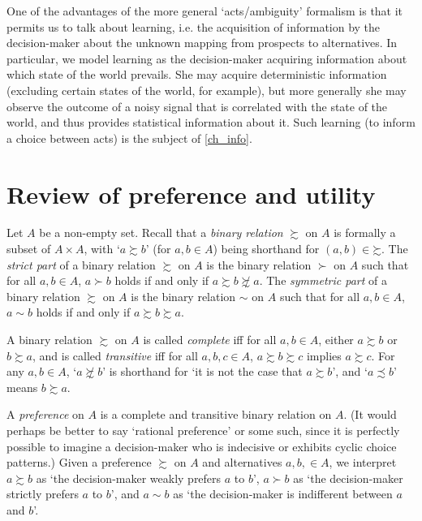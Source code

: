 \documentclass[11pt,letterpaper,reqno,oneside]{book}
\begin{document}
One of the advantages of the more general `acts/ambiguity' formalism is that it permits us to talk about learning, i.e. the acquisition of information by the decision-maker about the unknown mapping from prospects to alternatives. In particular, we model learning as the decision-maker acquiring information about which state of the world prevails. She may acquire deterministic information (excluding certain states of the world, for example), but more generally she may observe the outcome of a noisy signal that is correlated with the state of the world, and thus provides statistical information about it. Such learning (to inform a choice between acts) is the subject of \cref{ch_info}.



\section{Review of preference and utility}
\label{ch0:review}

Let $A$ be a non-empty set. Recall that a \emph{binary relation} $\succsim$ on $A$ is formally a subset of $A \times A$, with `$a \succsim b$' (for $a,b \in A$) being shorthand for $(a,b) \in \mathord{\succsim}$. The \emph{strict part} of a binary relation $\succsim$ on $A$ is the binary relation $\succ$ on $A$ such that for all $a,b \in A$, $a \succ b$ holds if and only if $a \succsim b \not\succsim a$. The \emph{symmetric part} of a binary relation $\succsim$ on $A$ is the binary relation $\sim$ on $A$ such that for all $a,b \in A$, $a \sim b$ holds if and only if $a \succsim b \succsim a$.

A binary relation $\succsim$ on $A$ is called \emph{complete} iff for all $a,b \in A$, either $a \succsim b$ or $b \succsim a$, and is called \emph{transitive} iff for all $a,b,c \in A$, $a \succsim b \succsim c$ implies $a \succsim c$. For any $a,b \in A$, `$a \not\succsim b$' is shorthand for `it is not the case that $a \succsim b$', and `$a \precsim b$' means $b \succsim a$.

A \emph{preference} on $A$ is a complete and transitive binary relation on $A$. (It would perhaps be better to say `rational preference' or some such, since it is perfectly possible to imagine a decision-maker who is indecisive or exhibits cyclic choice patterns.) Given a preference $\succsim$ on $A$ and alternatives $a,b, \in A$, we interpret $a \succsim b$ as `the decision-maker weakly prefers $a$ to $b$', $a \succ b$ as `the decision-maker strictly prefers $a$ to $b$', and $a \sim b$ as `the decision-maker is indifferent between $a$ and $b$'.
\end{document}
